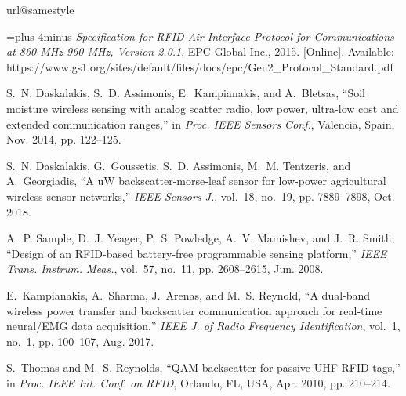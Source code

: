 \documentclass[journal]{IEEEtran}
\begin{document}
 

\begin{thebibliography}{10}
\providecommand{\url}[1]{#1}
\csname url@samestyle\endcsname
\providecommand{\newblock}{\relax}
\providecommand{\bibinfo}[2]{#2}
\providecommand{\BIBentrySTDinterwordspacing}{\spaceskip=0pt\relax}
\providecommand{\BIBentryALTinterwordstretchfactor}{4}
\providecommand{\BIBentryALTinterwordspacing}{\spaceskip=\fontdimen2\font plus
\BIBentryALTinterwordstretchfactor\fontdimen3\font minus
  \fontdimen4\font\relax}
\providecommand{\BIBforeignlanguage}[2]{{%
\expandafter\ifx\csname l@#1\endcsname\relax
\typeout{** WARNING: IEEEtran.bst: No hyphenation pattern has been}%
\typeout{** loaded for the language `#1'. Using the pattern for}%
\typeout{** the default language instead.}%
\else
\language=\csname l@#1\endcsname
\fi
#2}}
\providecommand{\BIBdecl}{\relax}
\BIBdecl

\BIBentryALTinterwordspacing
\emph{Specification for {RFID} Air Interface Protocol for Communications at 860
  MHz-960 MHz, Version 2.0.1}, EPC Global Inc., 2015. [Online]. Available:
  \url{https://www.gs1.org/sites/default/files/docs/epc/Gen2_Protocol_Standard.pdf}
\BIBentrySTDinterwordspacing

S.~N. Daskalakis, S.~D. Assimonis, E.~Kampianakis, and A.~Bletsas, ``Soil
  moisture wireless sensing with analog scatter radio, low power, ultra-low
  cost and extended communication ranges,'' in \emph{Proc. {IEEE} Sensors
  Conf.}, Valencia, {S}pain, Nov. 2014, pp. 122--125.

S.~N. Daskalakis, G.~Goussetis, S.~D. Assimonis, M.~M. Tentzeris, and
  A.~Georgiadis, ``A u{W} backscatter-morse-leaf sensor for low-power
  agricultural wireless sensor networks,'' \emph{{IEEE} Sensors J.}, vol.~18,
  no.~19, pp. 7889--7898, Oct. 2018.

A.~P. Sample, D.~J. Yeager, P.~S. Powledge, A.~V. Mamishev, and J.~R. Smith,
  ``Design of an {RFID}-based battery-free programmable sensing platform,''
  \emph{{IEEE} Trans. Instrum. Meas.}, vol.~57, no.~11, pp. 2608--2615, Jun.
  2008.

E.~Kampianakis, A.~Sharma, J.~Arenas, and M.~S. Reynold, ``A dual-band wireless
  power transfer and backscatter communication approach for real-time
  neural/{EMG} data acquisition,'' \emph{{IEEE} J. of Radio Frequency
  Identification}, vol.~1, no.~1, pp. 100--107, Aug. 2017.

S.~Thomas and M.~S. Reynolds, ``{QAM} backscatter for passive {UHF RFID}
  tags,'' in \emph{Proc. {IEEE} Int. Conf. on RFID}, Orlando, FL, USA, Apr.
  2010, pp. 210--214.


\end{thebibliography}
\end{document}
